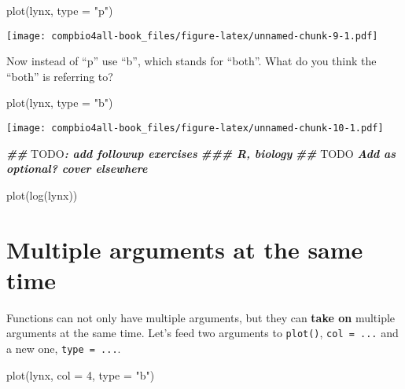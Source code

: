 \documentclass[
]{book}
\newenvironment{Shaded}{\begin{snugshade}}{\end{snugshade}}
\newcommand{\AlertTok}[1]{\textcolor[rgb]{0.94,0.16,0.16}{#1}}
\newcommand{\AttributeTok}[1]{\textcolor[rgb]{0.77,0.63,0.00}{#1}}
\newcommand{\DecValTok}[1]{\textcolor[rgb]{0.00,0.00,0.81}{#1}}
\newcommand{\DocumentationTok}[1]{\textcolor[rgb]{0.56,0.35,0.01}{\textbf{\textit{#1}}}}
\newcommand{\FunctionTok}[1]{\textcolor[rgb]{0.00,0.00,0.00}{#1}}
\newcommand{\NormalTok}[1]{#1}
\newcommand{\StringTok}[1]{\textcolor[rgb]{0.31,0.60,0.02}{#1}}
\begin{document}
\begin{Shaded}
\begin{Highlighting}[]
\FunctionTok{plot}\NormalTok{(lynx, }\AttributeTok{type =} \StringTok{"p"}\NormalTok{)}
\end{Highlighting}
\end{Shaded}

\texttt{[image: compbio4all-book\_files/figure-latex/unnamed-chunk-9-1.pdf]}

Now instead of ``p'' use ``b'', which stands for ``both''. What do you think the ``both'' is referring to?

\begin{Shaded}
\begin{Highlighting}[]
\FunctionTok{plot}\NormalTok{(lynx, }\AttributeTok{type =} \StringTok{"b"}\NormalTok{)}
\end{Highlighting}
\end{Shaded}

\texttt{[image: compbio4all-book\_files/figure-latex/unnamed-chunk-10-1.pdf]}

\begin{Shaded}
\begin{Highlighting}[]
\DocumentationTok{\#\# }\AlertTok{TODO}\DocumentationTok{: add followup exercises}
\DocumentationTok{\#\#\# R, biology}
\DocumentationTok{\#\# }\AlertTok{TODO}\DocumentationTok{ Add as optional? cover elsewhere}

\FunctionTok{plot}\NormalTok{(}\FunctionTok{log}\NormalTok{(lynx))}
\end{Highlighting}
\end{Shaded}

\hypertarget{multiple-arguments-at-the-same-time}{%
\section{Multiple arguments at the same time}\label{multiple-arguments-at-the-same-time}}

Functions can not only have multiple arguments, but they can \textbf{take on} multiple arguments at the same time. Let's feed two arguments to \texttt{plot()}, \texttt{col\ =\ ...} and a new one, \texttt{type\ =\ ...}.

\begin{Shaded}
\begin{Highlighting}[]
\FunctionTok{plot}\NormalTok{(lynx, }\AttributeTok{col =} \DecValTok{4}\NormalTok{, }\AttributeTok{type =} \StringTok{"b"}\NormalTok{)}
\end{Highlighting}
\end{Shaded}
\end{document}
